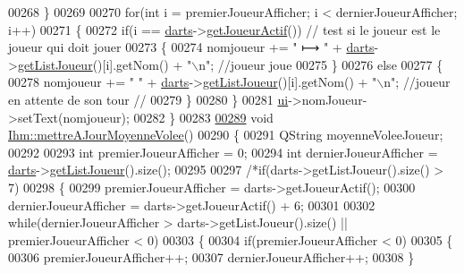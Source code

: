 \begin{DoxyCode}
00268     \}
00269 
00270     \textcolor{keywordflow}{for}(\textcolor{keywordtype}{int} i = premierJoueurAfficher; i < dernierJoueurAfficher; i++)
00271     \{
00272         \textcolor{keywordflow}{if}(i == \hyperlink{class_ihm_a2a0f54d33f4d6b2531ec2190c4a2356e}{darts}->\hyperlink{class_darts_a20ddfd28c8355c06a90cc23abff3de11}{getJoueurActif}())    \textcolor{comment}{// test si le joueur est le joueur qui doit
       jouer}
00273         \{
00274             nomjoueur += \textcolor{stringliteral}{"   ⟼ "} + \hyperlink{class_ihm_a2a0f54d33f4d6b2531ec2190c4a2356e}{darts}->\hyperlink{class_darts_a0525b09703d3461bf5570197354743c3}{getListJoueur}()[i].getNom() + \textcolor{stringliteral}{"\(\backslash\)n"};  \textcolor{comment}{//joueur
       joue}
00275         \}
00276         \textcolor{keywordflow}{else}
00277         \{
00278             nomjoueur += \textcolor{stringliteral}{"            "} + \hyperlink{class_ihm_a2a0f54d33f4d6b2531ec2190c4a2356e}{darts}->\hyperlink{class_darts_a0525b09703d3461bf5570197354743c3}{getListJoueur}()[i].getNom() + \textcolor{stringliteral}{"\(\backslash\)n"};     
        \textcolor{comment}{//joueur en attente de son tour //}
00279         \}
00280     \}
00281     \hyperlink{class_ihm_a0ac5f47856566ceeeca1720109bf70ea}{ui}->nomJoueur->setText(nomjoueur);
00282 \}
00283 
\hyperlink{class_ihm_abafc4398a910be8ab95a75fbdf176426}{00289} \textcolor{keywordtype}{void} \hyperlink{class_ihm_abafc4398a910be8ab95a75fbdf176426}{Ihm::mettreAJourMoyenneVolee}()
00290 \{
00291     QString moyenneVoleeJoueur;
00292 
00293     \textcolor{keywordtype}{int} premierJoueurAfficher = 0;
00294     \textcolor{keywordtype}{int} dernierJoueurAfficher = \hyperlink{class_ihm_a2a0f54d33f4d6b2531ec2190c4a2356e}{darts}->\hyperlink{class_darts_a0525b09703d3461bf5570197354743c3}{getListJoueur}().size();
00295 
00297     \textcolor{comment}{/*if(darts->getListJoueur().size() > 7)}
00298 \textcolor{comment}{    \{}
00299 \textcolor{comment}{        premierJoueurAfficher = darts->getJoueurActif();}
00300 \textcolor{comment}{        dernierJoueurAfficher = darts->getJoueurActif() + 6;}
00301 \textcolor{comment}{}
00302 \textcolor{comment}{        while(dernierJoueurAfficher > darts->getListJoueur().size() || premierJoueurAfficher < 0)}
00303 \textcolor{comment}{        \{}
00304 \textcolor{comment}{            if(premierJoueurAfficher < 0)}
00305 \textcolor{comment}{            \{}
00306 \textcolor{comment}{                premierJoueurAfficher++;}
00307 \textcolor{comment}{                dernierJoueurAfficher++;}
00308 \textcolor{comment}{            \}}

\end{DoxyCode}
